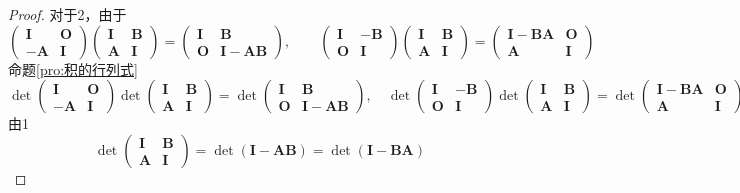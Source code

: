 \documentclass[lang = cn, scheme = chinese, thmcnt = section]{elegantbook}
\newcommand{\bs}{\boldsymbol}          %
\begin{document}
\begin{proof}
	对于2，由于%
	$$
	\begin{pmatrix}
		\bs{I} & \bs{O}\\
		-\bs{A} & \bs{I}
	\end{pmatrix}
	\begin{pmatrix}
		\bs{I} & \bs{B}\\
		\bs{A} & \bs{I}
	\end{pmatrix}
	=\begin{pmatrix}
		\bs{I} & \bs{B}\\
		\bs{O} & \bs{I}-\bs{AB}
	\end{pmatrix},\qquad \begin{pmatrix}
		\bs{I} & -\bs{B}\\
		\bs{O} & \bs{I}
	\end{pmatrix}
	\begin{pmatrix}
		\bs{I} & \bs{B}\\
		\bs{A} & \bs{I}
	\end{pmatrix}
	=\begin{pmatrix}
		\bs{I}-\bs{BA} & \bs{O}\\
		\bs{A} & \bs{I}
	\end{pmatrix}
	$$
	命题\ref{pro:积的行列式}
	$$
	\det\begin{pmatrix}
		\bs{I} & \bs{O}\\
		-\bs{A} & \bs{I}
	\end{pmatrix}
	\det\begin{pmatrix}
		\bs{I} & \bs{B}\\
		\bs{A} & \bs{I}
	\end{pmatrix}
	=\det\begin{pmatrix}
		\bs{I} & \bs{B}\\
		\bs{O} & \bs{I}-\bs{AB}
	\end{pmatrix},\quad \det\begin{pmatrix}
		\bs{I} & -\bs{B}\\
		\bs{O} & \bs{I}
	\end{pmatrix}
	\det\begin{pmatrix}
		\bs{I} & \bs{B}\\
		\bs{A} & \bs{I}
	\end{pmatrix}
	=\det\begin{pmatrix}
		\bs{I}-\bs{BA} & \bs{O}\\
		\bs{A} & \bs{I}
	\end{pmatrix}
	$$
	由1
	$$
	\det\begin{pmatrix}
		\bs{I} & \bs{B}\\
		\bs{A} & \bs{I}
	\end{pmatrix}
	=\det(\bs{I}-\bs{AB})
	=\det(\bs{I}-\bs{BA})
	$$
\end{proof}
\end{document}
